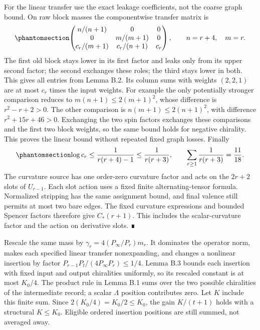 \documentclass[
  english,
  11pt,
  reqno]{amsart}
\newcounter{none} %
\begin{document}
For the linear transfer use the exact leakage coefficients, not the
coarse graph bound. On raw block masses the componentwise transfer
matrix is
\begin{equation}\protect\phantomsection\label{eq:gg-budget-linear-matrix}{
 \begin{pmatrix}
 n/(n+1)&0&0\\
 0&m/(m+1)&0\\
 c_r/(m+1)&c_r/(n+1)&c_r
 \end{pmatrix},\qquad n=r+4,\quad m=r .
}\end{equation} The first old block stays lower in its first factor and
leaks only from its upper second factor; the second exchanges these
roles; the third stays lower in both. This gives all entries from Lemma
B.2. Its column sums with weights \((2,2,1)\) are at most \(c_r\) times
the input weights. For example the only potentially stronger comparison
reduces to \(m(n+1)\le2(m+1)^2\), whose difference is \(r^2-r+2>0\). The
other comparison is \(n(m+1)\le2(n+1)^2\), with difference
\(r^2+15r+46>0\). Exchanging the two spin factors exchanges these
comparisons and the first two block weights, so the same bound holds for
negative chirality. This proves the linear bound without repeated fixed
graph losses. Finally
\begin{equation}\protect\phantomsection\label{eq:gg-budget-linear-product}{
 \log c_r\le\frac1{r(r+4)-1}\le\frac1{r(r+3)},\qquad
 \sum_{r\ge1}\frac1{r(r+3)}=\frac{11}{18}.
}\end{equation} The curvature source has one order-zero curvature factor
and acts on the \(2r+2\) slots of \(U_{r-1}\). Each slot action uses a
fixed finite alternating-tensor formula. Normalized stripping has the
same assignment bound, and final valence still permits at most two bare
edges. The fixed curvature expressions and bounded Spencer factors
therefore give \(C_*(r+1)\). This includes the scalar-curvature factor
and the action on derivative slots. ∎

Rescale the same mass by \(\gamma_r=4(P_\infty/P_r)m_r\). It dominates
the operator norm, makes each specified linear transfer nonexpanding,
and changes a nonlinear insertion by factor
\(P_{r-1}P_t/(4P_\infty P_r)\le1/4\). Lemma B.3 bounds each insertion
with fixed input and output chiralities uniformly, so its rescaled
constant is at most \(K_0/4\). The product rule in Lemma B.1 sums over
the two possible chiralities of the intermediate record; a scalar
\(\Lambda\) position contributes zero. Let \(K\) include this finite
sum. Since \(2(K_0/4)=K_0/2\le K_0\), the gain \(K/(t+1)\) holds with a
structural \(K\le K_0\). Eligible ordered insertion positions are still
summed, not averaged away.
\end{document}
